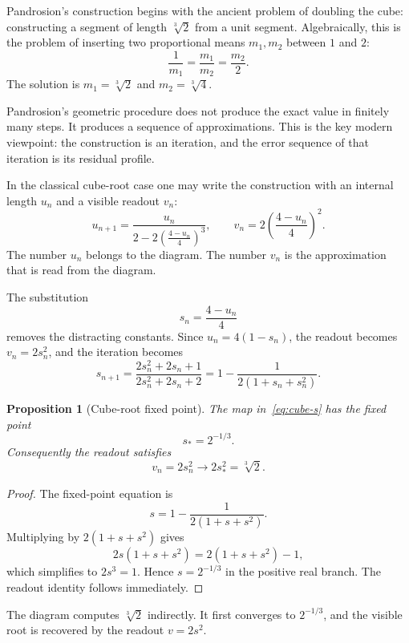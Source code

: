 \documentclass[11pt,a4paper]{article}
\theoremstyle{plain}
\newtheorem{proposition}[theorem]{Proposition}
\theoremstyle{definition}
\theoremstyle{remark}
\newcommand{\cbrt}[1]{\sqrt[3]{#1}}
\newenvironment{takeaway}{%
  \begin{center}\begin{minipage}{0.92\linewidth}\small\itshape\color{blue!45!black}%
}{%
  \end{minipage}\end{center}%
}
\begin{document}
Pandrosion's construction begins with the ancient problem of doubling the cube:
constructing a segment of length $\cbrt{2}$ from a unit segment.  Algebraically,
this is the problem of inserting two proportional means $m_1,m_2$ between $1$
and $2$:
\[
  \frac{1}{m_1}=\frac{m_1}{m_2}=\frac{m_2}{2}.
\]
The solution is $m_1=\cbrt{2}$ and $m_2=\cbrt{4}$.

Pandrosion's geometric procedure does not produce the exact value in finitely
many steps.  It produces a sequence of approximations.  This is the key modern
viewpoint: the construction is an iteration, and the error sequence of that
iteration is its residual profile.

In the classical cube-root case one may write the construction with an internal
length $u_n$ and a visible readout $v_n$:
\begin{equation}
  u_{n+1}
  =\frac{u_n}{2-2\left(\frac{4-u_n}{4}\right)^3},
  \qquad
  v_n=2\left(\frac{4-u_n}{4}\right)^2.
  \label{eq:classical-u}
\end{equation}
The number $u_n$ belongs to the diagram.  The number $v_n$ is the approximation
that is read from the diagram.

The substitution
\[
  s_n=\frac{4-u_n}{4}
\]
removes the distracting constants.  Since $u_n=4(1-s_n)$, the readout becomes
$v_n=2s_n^2$, and the iteration becomes
\begin{equation}
  s_{n+1}
  =\frac{2s_n^2+2s_n+1}{2s_n^2+2s_n+2}
  =1-\frac{1}{2(1+s_n+s_n^2)}.
  \label{eq:cube-s}
\end{equation}

\begin{proposition}[Cube-root fixed point]
The map in~\eqref{eq:cube-s} has the fixed point
\[
  s_*=2^{-1/3}.
\]
Consequently the readout satisfies
\[
  v_n=2s_n^2 \longrightarrow 2s_*^2=\cbrt{2}.
\]
\end{proposition}

\begin{proof}
The fixed-point equation is
\[
  s=1-\frac{1}{2(1+s+s^2)}.
\]
Multiplying by $2(1+s+s^2)$ gives
\[
  2s(1+s+s^2)=2(1+s+s^2)-1,
\]
which simplifies to $2s^3=1$.  Hence $s=2^{-1/3}$ in the positive real branch.
The readout identity follows immediately.
\end{proof}

\begin{takeaway}
The diagram computes $\cbrt{2}$ indirectly.  It first converges to
$2^{-1/3}$, and the visible root is recovered by the readout $v=2s^2$.
\end{takeaway}
\end{document}

